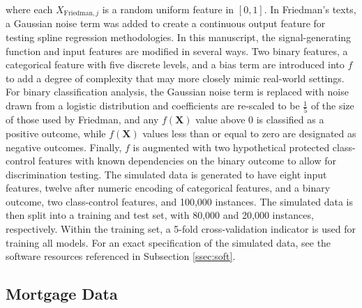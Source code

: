 \documentclass[information,article,submit,moreauthors,pdftex]{definitions/mdpi}
\begin{document}
\noindent where each $X_{\text{Friedman},j}$ is a random uniform feature in $[0,1]$. In Friedman's texts, a Gaussian noise term was added to create a continuous output feature for testing spline regression methodologies. In this manuscript, the signal-generating function and input features are modified in several ways.  Two binary features, a categorical feature with five discrete levels, and a bias term are introduced into $f$ to add a degree of complexity that may more closely mimic real-world settings. 
For binary classification analysis, the Gaussian noise term is replaced with noise drawn from a logistic distribution and coefficients are re-scaled to be $\frac{1}{5}$ of the size of those used by Friedman, and any $f(\mathbf{X})$ value above 0 is classified as a positive outcome, while $f(\mathbf{X})$ values less than or equal to zero are designated as negative outcomes.  Finally, $f$ is augmented with two hypothetical protected class-control features with known dependencies on the binary outcome to allow for discrimination testing. The simulated data is generated to have eight input features, twelve after numeric encoding of categorical features, and a binary outcome, two class-control features, and 100,000 instances. The simulated data is then split into a training and test set, with 80,000 and 20,000 instances, respectively.  Within the training set, a 5-fold cross-validation indicator is used for training all models. For an exact specification of the simulated data, see the software resources referenced in Subsection \ref{ssec:soft}.


\subsection{Mortgage Data}\label{ssec:mort_data}
\end{document}
